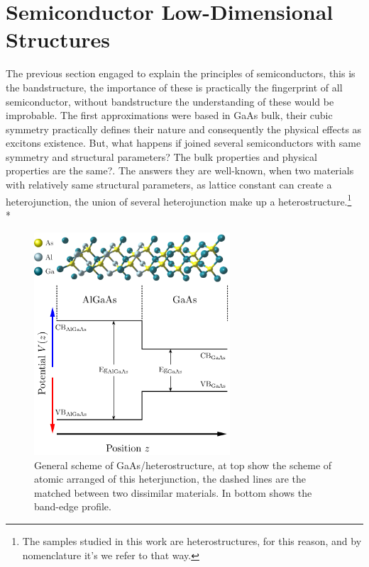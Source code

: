 \section{Semiconductor Low-Dimensional Structures}
\label{sec:chapter-1-low-dimensional-structures}
\vspace{-10mm} 
The previous section engaged to explain the principles of semiconductors, this is the bandstructure, the importance of these is practically the fingerprint of all semiconductor, without bandstructure  the understanding of these would be improbable. The first approximations were based in  GaAs bulk, their cubic symmetry practically defines their nature and consequently the physical effects as excitons existence.  But, what happens  if joined several semiconductors with same symmetry and structural parameters? The bulk properties and physical properties are the same?. 
The answers they are well-known, when two materials with relatively same structural parameters, as lattice constant can create a heterojunction, the union of several heterojunction make up a heterostructure.\footnote{The samples studied in this work are heterostructures, for this reason, and by nomenclature it's we refer to that way.}\\*
\begin{figure}[h]
	\centering
	\includegraphics[width=0.65\textwidth]{../figures/chapter-1/heterostructures/out-ruco/hs-01}
	\caption{General scheme of GaAs/\algaas heterostructure, at top show the scheme of atomic arranged of this heterjunction, the dashed lines are the matched between two dissimilar materials. In bottom shows the band-edge profile.}
	\label{fig:subsection-1.2-heterostructure}
\end{figure}
